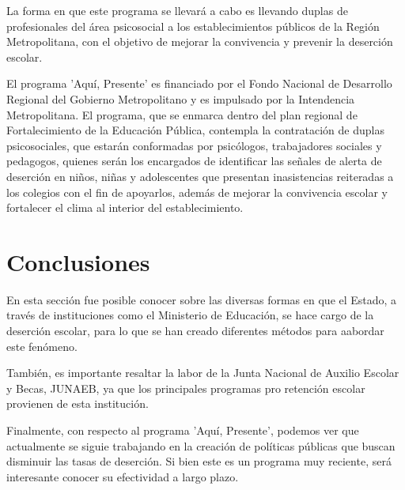 La forma en que este programa se llevará a cabo es llevando duplas de profesionales del área psicosocial a los establecimientos públicos de la Región Metropolitana, con el objetivo de mejorar la convivencia y prevenir la deserción escolar. 

El programa 'Aquí, Presente' es financiado por el Fondo Nacional de Desarrollo Regional del Gobierno Metropolitano y es impulsado por la Intendencia Metropolitana. El programa, que se enmarca dentro del plan regional de Fortalecimiento de la Educación Pública, contempla la contratación de duplas psicosociales, que estarán conformadas por psicólogos, trabajadores sociales y pedagogos, quienes serán los encargados de identificar las señales de alerta de deserción en niños, niñas y adolescentes que presentan inasistencias reiteradas a los colegios con el fin de apoyarlos, además de mejorar la convivencia escolar y fortalecer el clima al interior del establecimiento.

\section{Conclusiones}
En esta sección fue posible conocer sobre las diversas formas en que el Estado, a través de instituciones como el Ministerio de Educación, se hace cargo de la deserción escolar, para lo que se han creado diferentes métodos para aabordar este fenómeno. 

También, es importante resaltar la labor de la Junta Nacional de Auxilio Escolar y Becas, JUNAEB, ya que los principales programas pro retención escolar provienen de esta institución. 

Finalmente, con respecto al programa 'Aquí, Presente', podemos ver que actualmente se siguie trabajando en la creación de políticas públicas que buscan disminuir las tasas de deserción. Si bien este es un programa muy reciente, será interesante conocer su efectividad a largo plazo. 